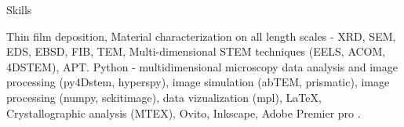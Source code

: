 
\begin{rubric}{Skills}

	Thin film deposition, Material characterization on all length scales - XRD, SEM, EDS, EBSD, FIB, TEM, Multi-dimensional STEM techniques (EELS, ACOM, 4DSTEM), APT.
	Python - multidimensional microscopy data analysis and image processing (py4Dstem, hyperspy), image simulation (abTEM, prismatic), image processing (numpy, sckitimage), data vizualization (mpl), \LaTeX, Crystallographic analysis (MTEX), Ovito, Inkscape, Adobe Premier pro .

\end{rubric}
